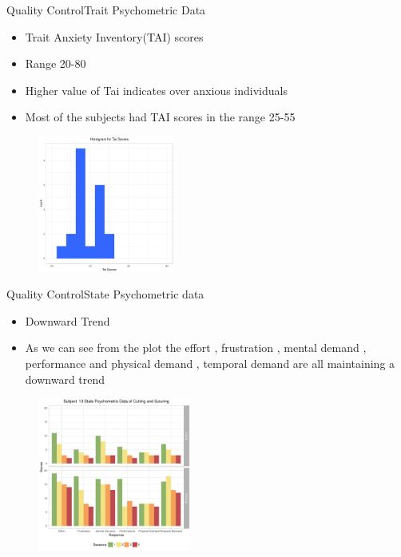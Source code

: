 \documentclass{beamer}
\begin{document}
\begin{frame}{Quality Control}{Trait Psychometric Data }

  \begin{itemize}
  \item {
    Trait Anxiety Inventory(TAI) scores}
\item {Range 20-80 }
\item {Higher value of Tai indicates   over anxious individuals }
\item {Most of the subjects had TAI scores in the range 25-55}
    \end{itemize}
    \begin{figure}
	\includegraphics[width=0.4\textwidth]{tai_plot.pdf}
	
\end{figure}
 \end{frame}
\begin{frame}{Quality Control}{State Psychometric  data }

  \begin{itemize}
  \item {
   Downward Trend}
  \item {   As we can see from the plot the effort , frustration , mental demand , performance and physical demand , temporal demand are all maintaining a downward trend
}
      \end{itemize}
    \begin{figure}
	\includegraphics[width=0.45\textwidth]{subject13_State_Psychometric_Data_of_Cutting_and_Suturing.pdf}
	\end{figure}
 \end{frame}
\end{document}
